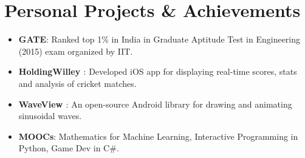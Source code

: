 \documentclass[letterpaper,11pt]{article}
\newcommand{\resumeItem}[2]{
	\item\normalsize{
		\textbf{#1}{: #2}
	}
}
\newcommand{\resumeSubItem}[2]{\resumeItem{#1}{#2}\vspace{-4pt}}
\newcommand{\resumeSubHeadingListStart}{\begin{itemize}[leftmargin=*]}
\newcommand{\resumeSubHeadingListEnd}{\end{itemize}}
\begin{document}
	\section{Personal Projects \& Achievements}
	\resumeSubHeadingListStart
	\resumeSubItem{GATE}
	{Ranked top 1\% in India in Graduate Aptitude Test in Engineering (2015) exam organized by IIT.} %
	\resumeSubItem{HoldingWilley \href{https://apps.apple.com/app/id1229976116}{\faApple}}
	{{Developed iOS app for displaying real-time scores, stats and analysis of cricket matches.}}
	\resumeSubItem{WaveView \href{https://github.com/narayanacharya6/WaveView}{\faGithub}}
	{An open-source Android library for drawing and animating sinusoidal waves.}
	\resumeSubItem{MOOCs}
	{Mathematics for Machine Learning, Interactive Programming in Python, Game Dev in C\#.}
	\resumeSubHeadingListEnd
	
	
\end{document}
